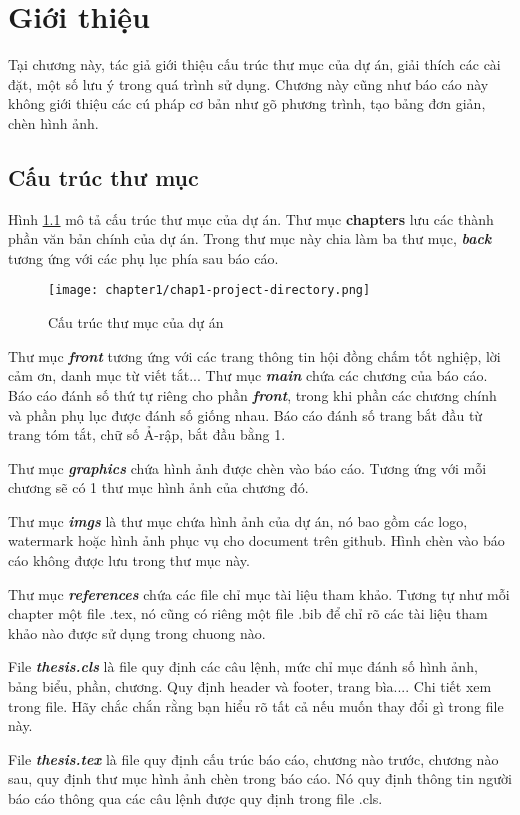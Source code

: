 \chapter{Giới thiệu}
\label{chap:chap1-introduce}

Tại chương này, tác giả giới thiệu cấu trúc thư mục của dự án, giải thích các cài đặt, một số lưu ý trong quá trình sử dụng. Chương này cũng như báo cáo này không giới thiệu các cú pháp cơ bản như gõ phương trình, tạo bảng đơn giản, chèn hình ảnh.

\section{Cấu trúc thư mục}

\indent Hình \ref{fig:chap1-project-directory} mô tả cấu trúc thư mục của dự án. Thư mục \textbf{chapters} lưu các thành phần văn bản chính của dự án. Trong thư mục này chia làm ba thư mục, \textbf{\textit{back}} tương ứng với các phụ lục phía sau báo cáo.

\begin{figure}
    \centering
    \texttt{[image: chapter1/chap1-project-directory.png]}
    \caption{Cấu trúc thư mục của dự án}
    \label{fig:chap1-project-directory}
\end{figure}

Thư mục \textbf{\textit{front}} tương ứng với các trang thông tin hội đồng chấm tốt nghiệp, lời cảm ơn, danh mục từ viết tắt... Thư mục \textbf{\textit{main}} chứa các chương của báo cáo. Báo cáo đánh số thứ tự riêng cho phần \textit{\textbf{front}}, trong khi phần các chương chính và phần phụ lục được đánh số giống nhau. Báo cáo đánh số trang bắt đầu từ trang tóm tắt, chữ số Ả-rập, bắt đầu bằng 1.

Thư mục \textbf{\textit{graphics}} chứa hình ảnh được chèn vào báo cáo. Tương ứng với mỗi chương sẽ có 1 thư mục hình ảnh của chương đó.

Thư mục \textbf{\textit{imgs}} là thư mục chứa hình ảnh của dự án, nó bao gồm các logo, watermark hoặc hình ảnh phục vụ cho document trên github. Hình chèn vào báo cáo không được lưu trong thư mục này.

Thư mục \textbf{\textit{references}} chứa các file chỉ mục tài liệu tham khảo. Tương tự như mỗi chapter một file .tex, nó cũng có riêng một file .bib để chỉ rõ các tài liệu tham khảo nào được sử dụng trong chuong nào.

File \textbf{\textit{thesis.cls}} là file quy định các câu lệnh, mức chỉ mục đánh số hình ảnh, bảng biểu, phần, chương. Quy định header và footer, trang  bìa.... Chi tiết xem trong file. Hãy chắc chắn rằng bạn hiểu rõ tất cả nếu muốn thay đổi gì trong file này.

File \textbf{\textit{thesis.tex}} là file quy định cấu trúc báo cáo, chương nào trước, chương nào sau, quy định thư mục hình ảnh chèn trong báo cáo. Nó quy định thông tin người báo cáo thông qua các câu lệnh được quy định trong file .cls. 